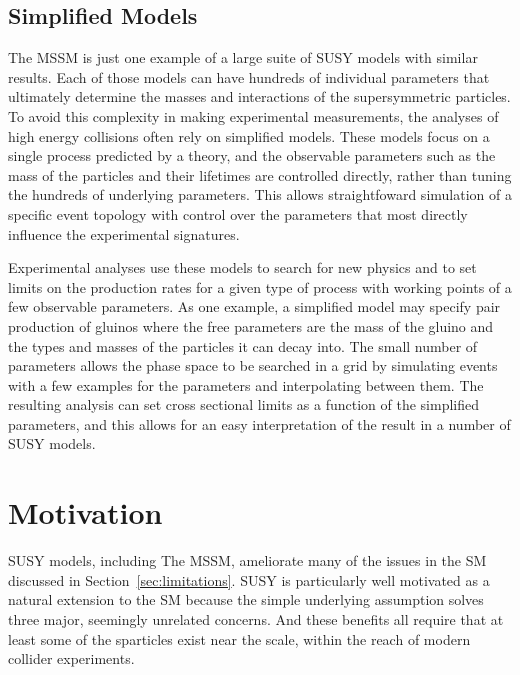 \subsection{Simplified Models}

The \ac{MSSM} is just one example of a large suite of \ac{SUSY} models with similar results.
Each of those models can have hundreds of individual parameters that ultimately determine the masses and interactions of the supersymmetric particles.
To avoid this complexity in making experimental measurements, the analyses of high energy collisions often rely on simplified models.
These models focus on a single process predicted by a theory, and the observable parameters such as the mass of the particles and their lifetimes are controlled directly, rather than tuning the hundreds of underlying parameters.
This allows straightfoward simulation of a specific event topology with control over the parameters that most directly influence the experimental signatures.

Experimental analyses use these models to search for new physics and to set limits on the production rates for a given type of process with working points of a few observable parameters.
As one example, a simplified model may specify pair production of gluinos where the free parameters are the mass of the gluino and the types and masses of the particles it can decay into.
The small number of parameters allows the phase space to be searched in a grid by simulating events with a few examples for the parameters and interpolating between them.
The resulting analysis can set cross sectional limits as a function of the simplified parameters, and this allows for an easy interpretation of the result in a number of \ac{SUSY} models.

\section{Motivation}

\ac{SUSY} models, including The \ac{MSSM}, ameliorate many of the issues in the \ac{SM} discussed in Section~\ref{sec:limitations}.
\ac{SUSY} is particularly well motivated as a natural extension to the \ac{SM} because the simple underlying assumption solves three major, seemingly unrelated concerns.
And these benefits all require that at least some of the sparticles exist near the \TeV scale, within the reach of modern collider experiments.

